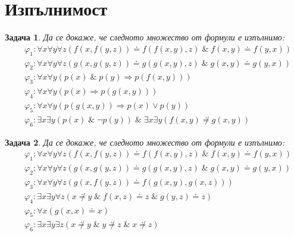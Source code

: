 \documentclass[12pt]{article}
\newtheorem{problem}{Задача}[section]
\theoremstyle{definition}
\begin{document}
\newpage

\section{Изпълнимост}

\begin{problem}
Да се докаже, че следното множество от формули е изпълнимо:
\begin{align*}
     & \varphi_1 : \forall x \forall y \forall z (f(x, f(y, z)) \doteq f(f(x, y), z) \; \& \; f(x, y) \doteq f(y, x))       \\
     & \varphi_2 : \forall x \forall y \forall z (g(x, g(y, z)) \doteq g(g(x, y), z) \; \& \; g(x, y) \doteq g(y, x))       \\
     & \varphi_3 : \forall x \forall y (p(x) \; \& \; p(y) \Rightarrow p(f(x, y)))                                          \\
     & \varphi_4 : \forall x \forall y (p(x) \Rightarrow p(g(x, y)))                                                        \\
     & \varphi_5 : \forall x \forall y (p(g(x, y)) \Rightarrow p(x) \lor p(y))                                              \\
     & \varphi_6 : \exists x \exists y (p(x) \; \& \; \neg p(y)) \; \& \; \exists x \exists y (f(x, y) \not \doteq g(x, y))
\end{align*}
\end{problem}

\begin{problem}
Да се докаже, че следното множество от формули е изпълнимо:
\begin{align*}
     & \varphi_1 : \forall x \forall y \forall z (f(x, f(y, z)) \doteq f(f(x, y), z) \; \& \; f(x, y) \doteq f(y, x))  \\
     & \varphi_2 : \forall x \forall y \forall z (g(x, g(y, z)) \doteq g(g(x, y), z) \; \& \; g(x, y) \doteq g(y, x))  \\
     & \varphi_3 : \forall x \forall y \forall z (g(x, f(y, z)) \doteq f(g(x, y), g(x, z)))                            \\
     & \varphi_4 : \exists x \exists y \forall z (x \not \doteq y \; \& \; f(x, z) \doteq z \; \& \; g(y, z) \doteq z) \\
     & \varphi_5 : \forall x (g(x, x) \doteq x)                                                                        \\
     & \varphi_6 : \exists x \exists y \exists z (x \not \doteq y \; \& \; y \not \doteq z \; \& \; x \not \doteq z)
\end{align*}
\end{problem}
\end{document}
